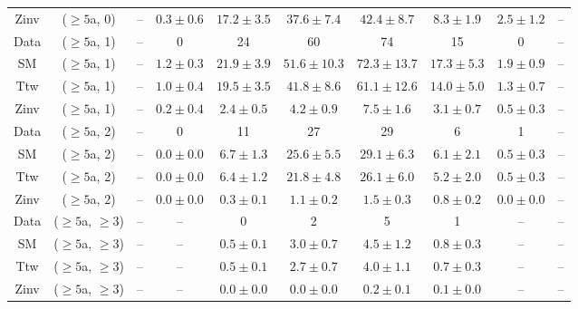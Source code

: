 \begin{table}[h!]
{\begin{tabular}{cccccccccc}
	Zinv & ($\ge5$a, 0) & -- & $0.3\pm 0.6$ & $17.2\pm 3.5$ & $37.6\pm 7.4$ & $42.4\pm 8.7$ & $8.3\pm 1.9$ & $2.5\pm 1.2$ & -- \\[0.5ex] 
	Data & ($\ge5$a, 1) & -- & 0 & 24 & 60 & 74 & 15 & 0 & -- \\[0.5ex] 
	SM & ($\ge5$a, 1) & -- & $1.2\pm 0.3$ & $21.9\pm 3.9$ & $51.6\pm 10.3$ & $72.3\pm 13.7$ & $17.3\pm 5.3$ & $1.9\pm 0.9$ & -- \\[0.5ex] 
	Ttw & ($\ge5$a, 1) & -- & $1.0\pm 0.4$ & $19.5\pm 3.5$ & $41.8\pm 8.6$ & $61.1\pm 12.6$ & $14.0\pm 5.0$ & $1.3\pm 0.7$ & -- \\[0.5ex] 
	Zinv & ($\ge5$a, 1) & -- & $0.2\pm 0.4$ & $2.4\pm 0.5$ & $4.2\pm 0.9$ & $7.5\pm 1.6$ & $3.1\pm 0.7$ & $0.5\pm 0.3$ & -- \\[0.5ex] 
	Data & ($\ge5$a, 2) & -- & 0 & 11 & 27 & 29 & 6 & 1 & -- \\[0.5ex] 
	SM & ($\ge5$a, 2) & -- & $0.0\pm 0.0$ & $6.7\pm 1.3$ & $25.6\pm 5.5$ & $29.1\pm 6.3$ & $6.1\pm 2.1$ & $0.5\pm 0.3$ & -- \\[0.5ex] 
	Ttw & ($\ge5$a, 2) & -- & $0.0\pm 0.0$ & $6.4\pm 1.2$ & $21.8\pm 4.8$ & $26.1\pm 6.0$ & $5.2\pm 2.0$ & $0.5\pm 0.3$ & -- \\[0.5ex] 
	Zinv & ($\ge5$a, 2) & -- & $0.0\pm 0.0$ & $0.3\pm 0.1$ & $1.1\pm 0.2$ & $1.5\pm 0.3$ & $0.8\pm 0.2$ & $0.0\pm 0.0$ & -- \\[0.5ex] 
	Data & ($\ge5$a, $\ge3$) & -- & -- & 0 & 2 & 5 & 1 & -- & -- \\[0.5ex] 
	SM & ($\ge5$a, $\ge3$) & -- & -- & $0.5\pm 0.1$ & $3.0\pm 0.7$ & $4.5\pm 1.2$ & $0.8\pm 0.3$ & -- & -- \\[0.5ex] 
	Ttw & ($\ge5$a, $\ge3$) & -- & -- & $0.5\pm 0.1$ & $2.7\pm 0.7$ & $4.0\pm 1.1$ & $0.7\pm 0.3$ & -- & -- \\[0.5ex] 
	Zinv & ($\ge5$a, $\ge3$) & -- & -- & $0.0\pm 0.0$ & $0.0\pm 0.0$ & $0.2\pm 0.1$ & $0.1\pm 0.0$ & -- & -- \\[0.5ex] 
	\hline
	\hline
\end{tabular}}
\end{table}
